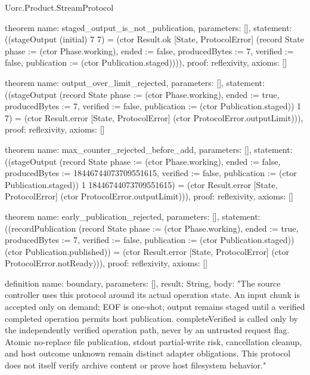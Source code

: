 \begin{lexlean}{Uorc.Product.StreamProtocol}
\begin{semanticmodule}
theorem{
  name: staged_output_is_not_publication,
  parameters: [],
  statement: ((stageOutput (initial) 7 7) = (ctor Result.ok [State, ProtocolError] (record State {phase := (ctor Phase.working), ended := false, producedBytes := 7, verified := false, publication := (ctor Publication.staged)}))),
  proof: reflexivity{},
  axioms: []
}

theorem{
  name: output_over_limit_rejected,
  parameters: [],
  statement: ((stageOutput (record State {phase := (ctor Phase.working), ended := true, producedBytes := 7, verified := false, publication := (ctor Publication.staged)}) 1 7) = (ctor Result.error [State, ProtocolError] (ctor ProtocolError.outputLimit))),
  proof: reflexivity{},
  axioms: []
}

theorem{
  name: max_counter_rejected_before_add,
  parameters: [],
  statement: ((stageOutput (record State {phase := (ctor Phase.working), ended := false, producedBytes := 18446744073709551615, verified := false, publication := (ctor Publication.staged)}) 1 18446744073709551615) = (ctor Result.error [State, ProtocolError] (ctor ProtocolError.outputLimit))),
  proof: reflexivity{},
  axioms: []
}

theorem{
  name: early_publication_rejected,
  parameters: [],
  statement: ((recordPublication (record State {phase := (ctor Phase.working), ended := true, producedBytes := 7, verified := false, publication := (ctor Publication.staged)}) (ctor Publication.published)) = (ctor Result.error [State, ProtocolError] (ctor ProtocolError.notReady))),
  proof: reflexivity{},
  axioms: []
}

definition{
  name: boundary,
  parameters: [],
  result: String,
  body: "The source controller uses this protocol around its actual operation state. An input chunk is accepted only on demand; EOF is one-shot; output remains staged until a verified completed operation permits host publication. completeVerified is called only by the independently verified operation path, never by an untrusted request flag. Atomic no-replace file publication, stdout partial-write risk, cancellation cleanup, and host outcome unknown remain distinct adapter obligations. This protocol does not itself verify archive content or prove host filesystem behavior."
}
\end{semanticmodule}
\end{lexlean}
